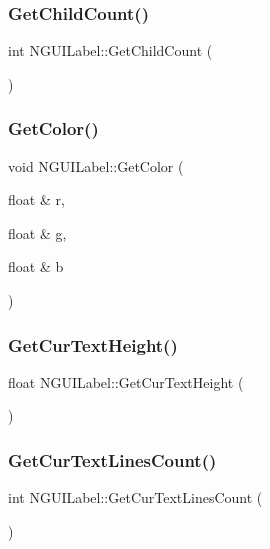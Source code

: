 \subsubsection{\texorpdfstring{Get\+Child\+Count()}{GetChildCount()}}
{\footnotesize\ttfamily int N\+G\+U\+I\+Label\+::\+Get\+Child\+Count (\begin{DoxyParamCaption}{ }\end{DoxyParamCaption})}

\hypertarget{class_n_g_u_i_label_a707bbe6791ef6613a47ccf1146a3295e}{}\label{class_n_g_u_i_label_a707bbe6791ef6613a47ccf1146a3295e} 
\subsubsection{\texorpdfstring{Get\+Color()}{GetColor()}}
{\footnotesize\ttfamily void N\+G\+U\+I\+Label\+::\+Get\+Color (\begin{DoxyParamCaption}\item[{float \&}]{r,  }\item[{float \&}]{g,  }\item[{float \&}]{b }\end{DoxyParamCaption})}

\hypertarget{class_n_g_u_i_label_ae4a257eb190fa67d29502125a830572c}{}\label{class_n_g_u_i_label_ae4a257eb190fa67d29502125a830572c} 
\subsubsection{\texorpdfstring{Get\+Cur\+Text\+Height()}{GetCurTextHeight()}}
{\footnotesize\ttfamily float N\+G\+U\+I\+Label\+::\+Get\+Cur\+Text\+Height (\begin{DoxyParamCaption}{ }\end{DoxyParamCaption})}

\hypertarget{class_n_g_u_i_label_accc156ab5abe647df17276b1eed54d82}{}\label{class_n_g_u_i_label_accc156ab5abe647df17276b1eed54d82} 
\subsubsection{\texorpdfstring{Get\+Cur\+Text\+Lines\+Count()}{GetCurTextLinesCount()}}
{\footnotesize\ttfamily int N\+G\+U\+I\+Label\+::\+Get\+Cur\+Text\+Lines\+Count (\begin{DoxyParamCaption}{ }\end{DoxyParamCaption})}

